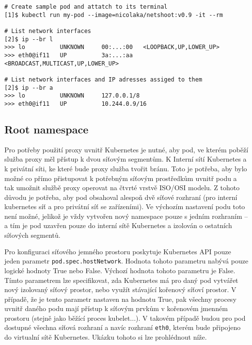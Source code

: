 \begin{verbatim}
# Create sample pod and attatch to its terminal
[1]$ kubectl run my-pod --image=nicolaka/netshoot:v0.9 -it --rm

# List network interfaces
[2]$ ip --br l
>>> lo          UNKNOWN     00:...:00   <LOOPBACK,UP,LOWER_UP> 
>>> eth0@if11   UP          3a:...:aa   <BROADCAST,MULTICAST,UP,LOWER_UP>

# List network interfaces and IP adresses assiged to them
[2]$ ip --br a
>>> lo          UNKNOWN     127.0.0.1/8 
>>> eth0@if11   UP          10.244.0.9/16  
\end{verbatim}

\subsection{Root namespace}
Pro potřeby použití proxy uvnitř Kubernetes je nutné, aby pod, ve kterém poběží služba proxy měl přístup k dvou síťovým segmentům. K Interní sítí Kubernetes a k privátní síti, ke které bude proxy služba tvořit bránu. Toto je potřeba, aby bylo možné co přímo přistupovat k potřebným síťovým prostředkům uvnitř podu a tak umožnit službě proxy operovat na čtvrté vrstvě ISO/OSI modelu. Z tohoto důvodu je potřeba, aby pod obsahoval alespoň dvě síťové rozhraní (pro interní kubernetes síť a pro privátní síť se zařízeními). Ve výchozím nastavení podu toto není možné, jelikož je vždy vytvořen nový namespace pouze s jedním rozhraním -- a tím je pod uzavřen pouze do interní sítě Kubernetes a izolován o ostatních síťových segmentů.

Pro konfiguraci síťového jemného prostoru poskytuje Kubernetes API pouze jeden parametr \verb|pod.spec.hostNetwork|. Hodnota tohoto parametru nabývá pouze logické hodnoty True nebo False. Výchozí hodnota tohoto parametru je False. Tímto parametrem lze specifikovat, zda Kubernetes má pro daný pod vytvářet nový izolovaný síťový prostor, nebo využít stávající kořenový síťoví prostor. V případě, že je tento parametr nastaven na hodnotu True, pak všechny procesy uvnitř daného podu mají přístup k síťovým prvkům v kořenovém jmenném prostoru (stejně jako běžící proces kubelet...). V takovém případě budou pro pod dostupné všechna síťová rozhraní a navíc rozhraní \verb|eth0|, kterém bude připojeno do virtualní sítě Kubernetes. Ukázku tohoto si lze prohlédnout níže.

